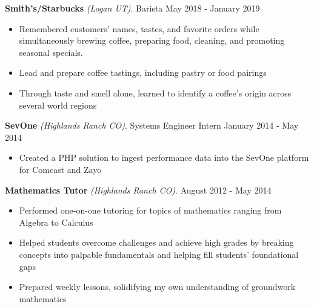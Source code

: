\documentclass[letterpaper,11pt]{article}
\begin{document}
\textbf{Smith's/Starbucks} \textit{(Logan UT)}. Barista \hfill May 2018 - January 2019
\begin{itemize}[noitemsep,topsep=0pt]
	\item Remembered customers' names, tastes, and favorite orders while simultaneously brewing coffee, preparing food, cleaning, and promoting seasonal specials.
	\item Lead and prepare coffee tastings, including pastry or food pairings
	\item Through taste and smell alone, learned to identify a coffee's origin across several world regions\\
\end{itemize}

\textbf{SevOne} \textit{(Highlands Ranch CO)}. Systems Engineer Intern \hfill January 2014 - May 2014
\begin{itemize}[noitemsep,topsep=0pt]
	\item Created a PHP solution to ingest performance data into the SevOne platform for Comcast and Zayo\\
\end{itemize}

\textbf{Mathematics Tutor} \textit{(Highlands Ranch CO)}. \hfill August 2012 - May 2014
\begin{itemize}[noitemsep,topsep=0pt]
	\item Performed one-on-one tutoring for topics of mathematics ranging from Algebra to Calculus
	\item Helped students overcome challenges and achieve high grades by breaking concepts into palpable fundamentals and helping fill students' foundational gaps
	\item Prepared weekly lessons, solidifying my own understanding of groundwork mathematics
\end{itemize}

\end{document}
